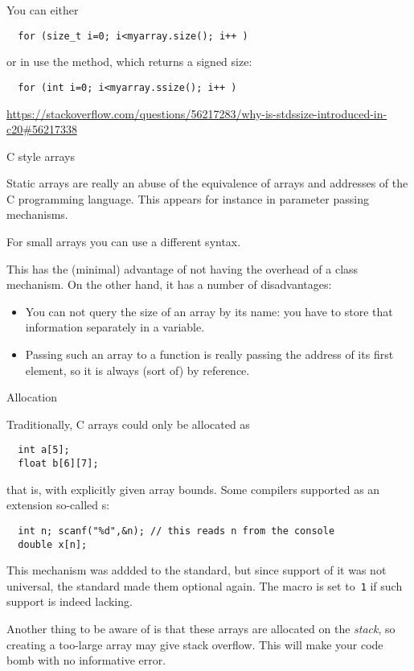 You can either
\begin{lstlisting}
  for (size_t i=0; i<myarray.size(); i++ )
\end{lstlisting}
or in  use the  method,
which returns a signed size:
\begin{lstlisting}
  for (int i=0; i<myarray.ssize(); i++ )
\end{lstlisting}

\url{https://stackoverflow.com/questions/56217283/why-is-stdssize-introduced-in-c20#56217338}

 {C style arrays}
\label{sec:staticarray}

Static arrays are really an abuse of the equivalence of arrays and
addresses of the C programming language. This appears for instance in
parameter passing mechanisms.

For small arrays you can use a different syntax. 


This has the
(minimal) advantage of not having the overhead of a class
mechanism. On the other hand, it has a number of disadvantages:
\begin{itemize}
\item You can not query the size of an array by its name: you have to
  store that information separately in a variable.
\item Passing such an array to a function is really passing the
  address of its first element, so it is always (sort of) by
  reference.
\end{itemize}

 {Allocation}

Traditionally, C arrays could only be allocated as
\begin{lstlisting}
  int a[5];
  float b[6][7];
\end{lstlisting}
that is, with explicitly given array bounds.
Some compilers supported as an extension
so-called s:
\begin{lstlisting}
  int n; scanf("%d",&n); // this reads n from the console
  double x[n];
\end{lstlisting}
This mechanism was addded to the  standard,
but since support of it was not universal,
the  standard made them optional again.
The macro  is set to~\lstinline{1}
if such support is indeed lacking.

Another thing to be aware of is that these arrays
are allocated on the \emph{stack},
so creating a too-large array may give stack overflow.
This will make your code bomb with no informative error.

